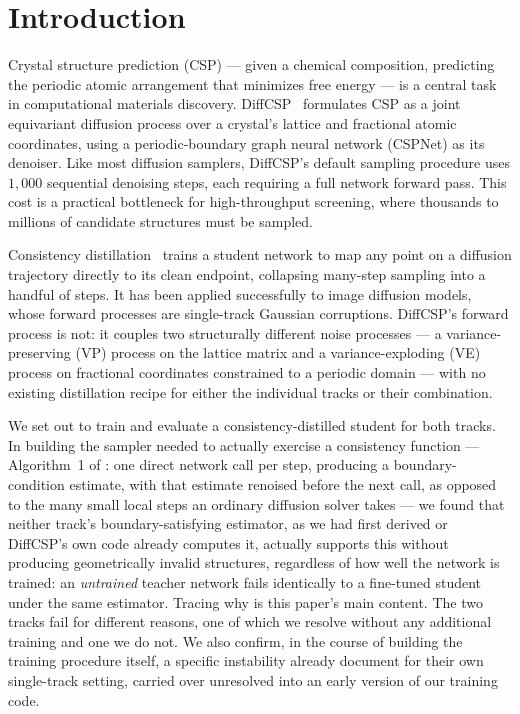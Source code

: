 \documentclass{article}
\begin{document}
\section{Introduction}

Crystal structure prediction (CSP) --- given a chemical composition, predicting the periodic atomic arrangement that minimizes free energy --- is a central task in computational materials discovery. DiffCSP~\citep{Jiao:2023diffcsp} formulates CSP as a joint equivariant diffusion process over a crystal's lattice and fractional atomic coordinates, using a periodic-boundary graph neural network (CSPNet) as its denoiser. Like most diffusion samplers, DiffCSP's default sampling procedure uses $1{,}000$ sequential denoising steps, each requiring a full network forward pass. This cost is a practical bottleneck for high-throughput screening, where thousands to millions of candidate structures must be sampled.

Consistency distillation~\citep{Song:2023cm} trains a student network to map any point on a diffusion trajectory directly to its clean endpoint, collapsing many-step sampling into a handful of steps. It has been applied successfully to image diffusion models, whose forward processes are single-track Gaussian corruptions. DiffCSP's forward process is not: it couples two structurally different noise processes --- a variance-preserving (VP) process on the lattice matrix and a variance-exploding (VE) process on fractional coordinates constrained to a periodic domain --- with no existing distillation recipe for either the individual tracks or their combination.

We set out to train and evaluate a consistency-distilled student for both tracks. In building the sampler needed to actually exercise a consistency function --- Algorithm~1 of \citet{Song:2023cm}: one direct network call per step, producing a boundary-condition estimate, with that estimate renoised before the next call, as opposed to the many small local steps an ordinary diffusion solver takes --- we found that neither track's boundary-satisfying estimator, as we had first derived or DiffCSP's own code already computes it, actually supports this without producing geometrically invalid structures, regardless of how well the network is trained: an \emph{untrained} teacher network fails identically to a fine-tuned student under the same estimator. Tracing why is this paper's main content. The two tracks fail for different reasons, one of which we resolve without any additional training and one we do not. We also confirm, in the course of building the training procedure itself, a specific instability \citet{Song:2023cm} already document for their own single-track setting, carried over unresolved into an early version of our training code.
\end{document}
